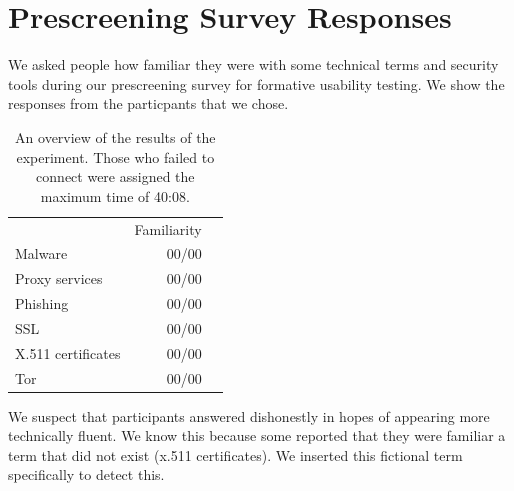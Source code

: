 \documentclass[USenglish,oneside,twocolumn]{article}
\begin{document}
{\color {red}
\section{Prescreening Survey Responses}
\label{prescreening-responses}
We asked people how familiar they were with some technical terms and security tools during our prescreening survey for formative usability testing. We show the responses from the particpants that we chose. 

\begin{table}[h]
\centering
\begin{tabular}{l r r}
& Familiarity\\
\noalign{\hrule}
Malware & 00/00\\
Proxy services & 00/00\\
Phishing & 00/00\\
SSL & 00/00\\
X.511 certificates & 00/00\\
Tor & 00/00\\
\end{tabular}
\caption{
An overview of the results of the experiment. Those who
failed to connect were assigned the maximum time of 40:08.
}
\label{table:selfreported-tech}
\end{table}

We suspect that participants answered dishonestly in hopes of appearing more technically fluent. We know this because some reported that they were familiar a term that did not exist (x.511 certificates). We inserted this fictional term specifically to detect this. 

}
\end{document}

